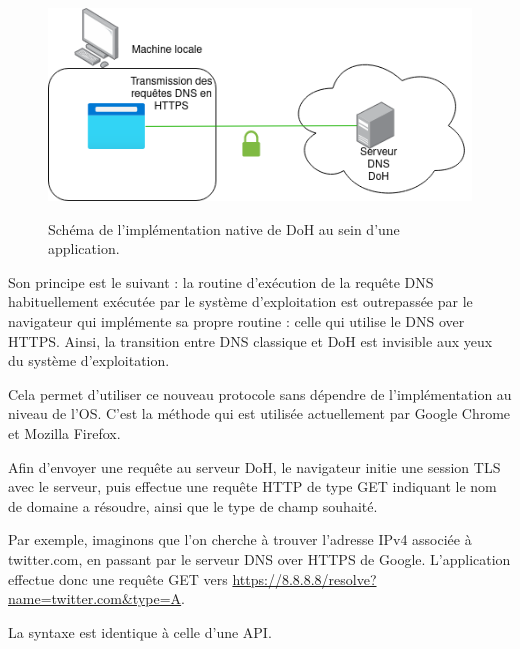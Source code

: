 \documentclass[a4paper,12pt]{article}
\begin{document}
	\begin{figure}[H]
		\begin{center}
			{\includegraphics[scale=0.6]{Images/schema_doh_native.png}}
		\end{center}
		\caption{Schéma de l'implémentation native de DoH au sein d'une application.}
	\end{figure}

	Son principe est le suivant : la routine d'exécution de la requête DNS habituellement exécutée par le système d'exploitation est outrepassée par le navigateur qui implémente sa propre routine : celle qui utilise le DNS over HTTPS. Ainsi, la transition entre DNS classique et DoH est invisible aux yeux du système d'exploitation. 
	
	Cela permet d'utiliser ce nouveau protocole sans dépendre de l'implémentation au niveau de l'OS. C'est la méthode qui est utilisée actuellement par Google Chrome et Mozilla Firefox.
	
	Afin d'envoyer une requête au serveur DoH, le navigateur initie une session TLS avec le serveur, puis  effectue une requête HTTP de type GET indiquant le nom de domaine a résoudre, ainsi que le type de champ souhaité.
	
	Par exemple, imaginons que l'on cherche à trouver l'adresse IPv4 associée à twitter.com, en passant par le serveur DNS over HTTPS de Google.
	L'application effectue donc une requête GET vers \url{https://8.8.8.8/resolve?name=twitter.com&type=A}.
	
	La syntaxe est identique à celle d'une API.
	
	\newpage
	
\end{document}
